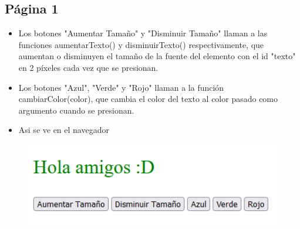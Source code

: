 \documentclass{article}
\begin{document}
	\subsection{Página 1}
 		
		\begin{itemize}
			\item Los botones "Aumentar Tamaño" y "Disminuir Tamaño" llaman a las funciones aumentarTexto() y disminuirTexto() respectivamente, que aumentan o disminuyen el tamaño de la fuente del elemento con el id "texto" en 2 píxeles cada vez que se presionan.
			\item Los botones "Azul", "Verde" y "Rojo" llaman a la función cambiarColor(color), que cambia el color del texto al color pasado como argumento cuando se presionan.
			\item Asi se ve en el navegador
		\end{itemize}  
		\begin{figure}[H]
			\centering
			\includegraphics[width=1.0\textwidth,keepaspectratio]{img/pagina1.PNG}
		\end{figure}
\end{document}
